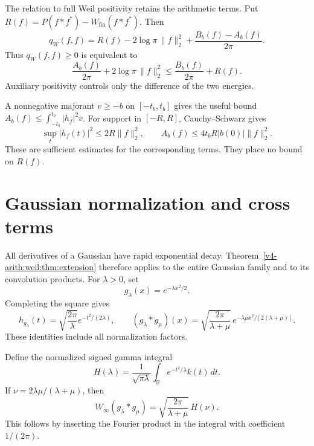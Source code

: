 The relation to full Weil positivity retains the arithmetic terms.
Put \(R(f)=P(f*f^*)-W_{\mathrm{fin}}(f*f^*)\). Then
\begin{equation}
 q_W(f,f)=R(f)-2\log\pi\,\|f\|_2^2
                       +\frac{B_b(f)-A_b(f)}{2\pi}.
 \label{v4-arith:weil:eq:full-energy}
\end{equation}
Thus \(q_W(f,f)\ge0\) is equivalent to
\[
 \frac{A_b(f)}{2\pi}+2\log\pi\,\|f\|_2^2
       \le\frac{B_b(f)}{2\pi}+R(f).
\]
Auxiliary positivity controls only the difference of the two energies.

A nonnegative majorant \(v\ge-b\) on \([-t_b,t_b]\) gives the useful
bound \(A_b(f)\le\int_{-t_b}^{t_b}|h_f|^2v\).
For support in \([-R,R]\), Cauchy--Schwarz gives
\[
 \sup_t|h_f(t)|^2\le2R\|f\|_2^2,\qquad
 A_b(f)\le4t_bR|b(0)|\|f\|_2^2.
\]
These are sufficient estimates for the corresponding terms.
They place no bound on \(R(f)\).

\section{Gaussian normalization and cross terms}
\label{v4-arith:weil:gaussians}

All derivatives of a Gaussian have rapid exponential decay.
Theorem~\ref{v4-arith:weil:thm:extension} therefore applies to the
entire Gaussian family and to its convolution products.
For \(\lambda>0\), set
\[
 g_\lambda(x)=e^{-\lambda x^2/2}.
\]
Completing the square gives
\begin{equation}
 h_{g_\lambda}(t)=\sqrt{\frac{2\pi}{\lambda}}e^{-t^2/(2\lambda)},
 \qquad
 (g_\lambda*g_\mu)(x)=
 \sqrt{\frac{2\pi}{\lambda+\mu}}\,
         e^{-\lambda\mu x^2/[2(\lambda+\mu)]}.
 \label{v4-arith:weil:eq:gaussian-convolution}
\end{equation}
These identities include all normalization factors.

Define the normalized signed gamma integral
\begin{equation}
 H(\lambda)=\frac1{\sqrt{\pi\lambda}}
                   \int_{\mathbb R}e^{-t^2/\lambda}k(t)\,dt.
 \label{v4-arith:weil:eq:H}
\end{equation}
If \(\nu=2\lambda\mu/(\lambda+\mu)\), then
\begin{equation}
 W_\infty(g_\lambda*g_\mu)
       =\sqrt{\frac{2\pi}{\lambda+\mu}}\,H(\nu).
 \label{v4-arith:weil:eq:gaussian-gamma}
\end{equation}
This follows by inserting the Fourier product in the integral
with coefficient \(1/(2\pi)\).

